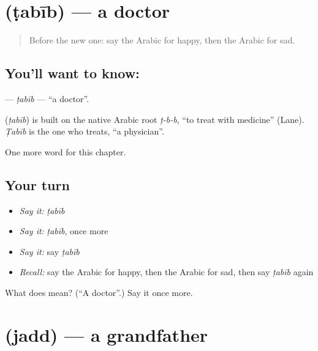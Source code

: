 \section[\texorpdfstring{\ar{طبيب} (ṭabīb)}{طبيب (ṭabīb)}]{ (ṭabīb) — a doctor}

\label{lesson:AR-C54-tabib}



\begin{quote}
Before the new one: say the Arabic for happy, then the Arabic for sad.
\end{quote}

\subsection*{You'll want to know: }
\textbf{} — \emph{ṭabīb} — \textquotedblleft{}a doctor\textquotedblright{}.

\begin{cousinweb}
\textbf{} (\emph{ṭabīb}) is built on the native Arabic root \emph{ṭ-b-b}, \textquotedblleft{}to treat with medicine\textquotedblright{} (Lane). \emph{Ṭabīb} is the one who treats, \textquotedblleft{}a physician\textquotedblright{}.
\end{cousinweb}

\begin{grammarlens}[title={What you've built}]
One more word for this chapter.
\end{grammarlens}

\subsection*{Your turn}
\begin{itemize}
\raggedright
  \item \emph{Say it:} \emph{ṭabīb}
  \item \emph{Say it:} \emph{ṭabīb}, once more
  \item \emph{Say it:} say \emph{ṭabīb}
  \item \emph{Recall:} say the Arabic for happy, then the Arabic for sad, then say \emph{ṭabīb} again
\end{itemize}

\begin{tcolorbox}[breakable,colback=teal!4,colframe=teal!35!black,title={Before you move on}]
What does  mean? (\textquotedblleft{}A doctor\textquotedblright{}.) Say it once more.
\end{tcolorbox}
\section[\texorpdfstring{\ar{جد} (jadd)}{جد (jadd)}]{ (jadd) — a grandfather}

